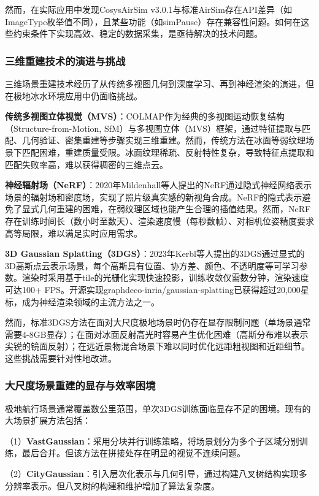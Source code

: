 \documentclass[12pt,a4paper]{ctexbook}
\begin{document}
然而，在实际应用中发现CosysAirSim v3.0.1与标准AirSim存在API差异（如ImageType枚举值不同），且某些功能（如simPause）存在兼容性问题。如何在这些约束条件下实现高效、稳定的数据采集，是亟待解决的技术问题。

\subsubsection{三维重建技术的演进与挑战}

三维场景重建技术经历了从传统多视图几何到深度学习、再到神经渲染的演进，但在极地冰水环境应用中仍面临挑战。

\textbf{传统多视图立体视觉（MVS）}：COLMAP作为经典的多视图运动恢复结构（Structure-from-Motion, SfM）与多视图立体（MVS）框架，通过特征提取与匹配、几何验证、密集重建等步骤实现三维重建。然而，传统方法在冰面等弱纹理场景下匹配困难，重建质量受限。冰面纹理稀疏、反射特性复杂，导致特征点提取和匹配失败率高，难以获得稠密的三维点云。

\textbf{神经辐射场（NeRF）}：2020年Mildenhall等人提出的NeRF通过隐式神经网络表示场景的辐射场和密度场，实现了照片级真实感的新视角合成。NeRF的隐式表示避免了显式几何重建的困难，在弱纹理区域也能产生合理的插值结果。然而，NeRF存在训练时间长（数小时至数天）、渲染速度慢（每秒数帧）、对相机位姿精度要求高等局限，难以满足实时应用需求。

\textbf{3D Gaussian Splatting（3DGS）}：2023年Kerbl等人提出的3DGS通过显式的3D高斯点云表示场景，每个高斯具有位置、协方差、颜色、不透明度等可学习参数。渲染时采用基于tile的光栅化实现快速投影，训练收敛仅需数分钟，渲染速度可达100+ FPS。开源实现graphdeco-inria/gaussian-splatting已获得超过20,000星标，成为神经渲染领域的主流方法之一。

然而，标准3DGS方法在面对大尺度极地场景时仍存在显存限制问题（单场景通常需要4-8GB显存）；在面对冰面反射高光时容易产生优化困难（高斯分布难以表示尖锐的镜面反射）；在远近景物混合场景下难以同时优化远距粗视图和近距细节。这些挑战需要针对性地改进。

\subsubsection{大尺度场景重建的显存与效率困境}

极地航行场景通常覆盖数公里范围，单次3DGS训练面临显存不足的困境。现有的大场景扩展方法包括：

（1）\textbf{VastGaussian}：采用分块并行训练策略，将场景划分为多个子区域分别训练，最后合并。但该方法在拼接处存在明显的视觉不连续问题。

（2）\textbf{CityGaussian}：引入层次化表示与几何引导，通过构建八叉树结构实现多分辨率表示。但八叉树的构建和维护增加了算法复杂度。
\end{document}

